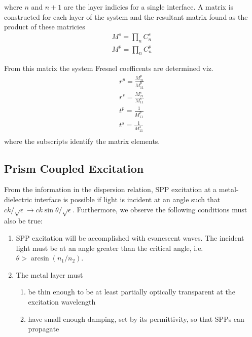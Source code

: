 where $n$ and $n+1$ are the layer indicies for a single interface.  A
matrix is constructed for each layer of the system and the resultant matrix
found as the product of these matricies
\begin{align}
M^s=\prod_n C^s_n\\
M^p=\prod_n C^p_n
\end{align}

From this matrix the system Fresnel coefficents are determined viz.
\begin{align}
r^p = \frac{M^p_{21}}{M^p_{11}}\\
r^s = \frac{M^s_{21}}{M^s_{11}}\\
t^p = \frac{1}{M^p_{11}}\\
t^s = \frac{1}{M^s_{11}}\\
\end{align}
where the subscripts identify the matrix elements.

\subsection{Prism Coupled Excitation}
From the information in the dispersion relation, SPP excitation at a
metal-dielectric interface is possible if light is incident at an angle such
that  $ck/\sqrt{\epsilon} \to ck\sin\theta/\sqrt{\epsilon}$.  Furthermore, we observe the following
conditions must also be true:
\begin{enumerate}
\item SPP excitation will be accomplished with evanescent waves.  The
incident light must be at an angle greater than the critical angle, i.e.
$\theta>\arcsin\left(n_1/n_2\right)$.
\item The metal layer must
\begin{enumerate}
\item be thin enough to be at least partially optically transparent at the excitation wavelength
\item have small enough damping, set by its permittivity, so that SPPs can propagate
\end{enumerate}
\end{enumerate}

